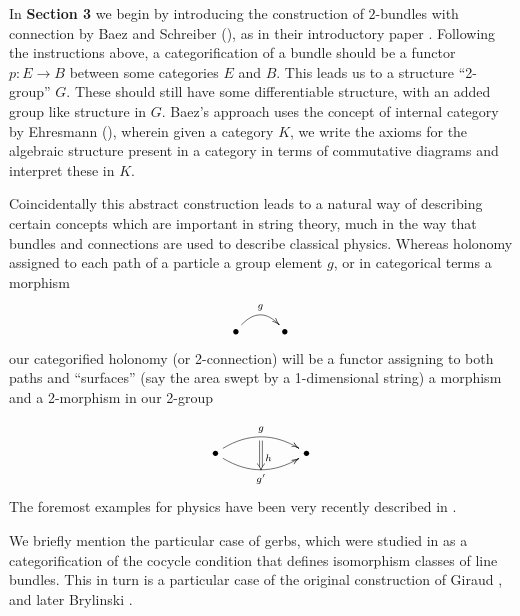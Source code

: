 In \textbf{Section 3} we begin by introducing the construction of $2$-bundles with connection by Baez and Schreiber (\cite{baez-2004}), as in their introductory paper \cite{baezhigher}. Following the instructions above, a categorification of a bundle should be a functor $p:E\rightarrow B$ between some categories $E$ and $B$. This leads us to a structure ``2-group'' $G$. These should still have some differentiable structure, with an added group like structure in $G$. Baez's approach uses the concept of internal category by Ehresmann (\cite{ehresmann}), wherein given a category $K$, we write the axioms for the algebraic structure present in a category in terms of commutative diagrams and interpret these in $K$.

% 

Coincidentally this abstract construction leads to a natural way of describing certain concepts which are important in string theory, much in the way that bundles and connections are used to describe classical physics. Whereas holonomy assigned to each path of a particle a group element $g$, or in categorical terms a morphism 
\[
 \xymatrix{ \bullet \ar@/^1pc/[r]^g & \bullet}
\]
our categorified holonomy (or 2-connection) will be a functor assigning to both paths and ``surfaces'' (say the area swept by a 1-dimensional string) a morphism and a 2-morphism in our 2-group

\[
 \xymatrix{ \bullet \ar@/^1pc/[rr]^{g}_{}="0"
           \ar@/_1pc/[rr]_{g'}="1"
           \ar@{=>}"0";"1"^{h} && \bullet}
\]
The foremost examples for physics have been very recently described in \cite{baezinvitation}. 

We briefly mention the particular case of gerbs, which were studied in \cite{chatterjee} as a categorification of the cocycle condition that defines isomorphism classes of line bundles. This in turn is a particular case of the original construction of Giraud \cite{giraud}, and later Brylinski \cite{brylinski}.

